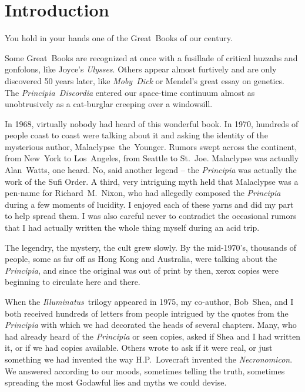 \chapter*{Introduction}
\vspace{4em} %

You hold in your hands one of the Great~Books of our century.

Some Great~Books are recognized at once with a fusillade of critical
huzzahs and gonfolons, like Joyce's \textit{Ulysses}. Others appear
almost furtively and are only discovered 50 years later, like
\textit{Moby~Dick} or Mendel's great essay on genetics. The
\textit{Principia~Discordia} entered our space-time continuum almost
as unobtrusively as a cat-burglar creeping over a
windowsill.

In 1968, virtually nobody had heard of this wonderful book. In 1970,
hundreds of people coast to coast were talking about it and asking the
identity of the mysterious author,
Malaclypse~the~Younger. Rumors swept across the
continent, from New~York to Los~Angeles, from Seattle to
St.~Joe. Malaclypse was actually Alan~Watts, one heard. No, said
another legend -- the \textit{Principia} was actually the work of the
Sufi Order. A third, very intriguing myth held that Malaclypse was a
pen-name for Richard~M.~Nixon, who had
allegedly composed the \textit{Principia} during a few moments of
lucidity. I enjoyed each of these yarns and did my part to help spread
them. I was also careful never to contradict the occasional rumors
that I had actually written the whole thing myself during an acid
trip.

The legendry, the mystery, the cult grew slowly. By the mid-1970's,
thousands of people, some as far off as Hong Kong and Australia, were
talking about the \textit{Principia}, and since the original was out
of print by then, xerox copies were beginning to circulate here and
there.

When the \textit{Illuminatus}~trilogy appeared in 1975, my co-author,
Bob~Shea, and I both received hundreds of letters from people
intrigued by the quotes from the \textit{Principia} with which we had
decorated the heads of several chapters. Many, who had already heard
of the \textit{Principia} or seen copies, asked if Shea and I had
written it, or if we had copies available. Others wrote to ask if it
were real, or just something we had invented the way H.P.~Lovecraft
invented the \textit{Necronomicon}. We answered according to our
moods, sometimes telling the truth, sometimes spreading the most
Godawful lies and myths we could devise.

